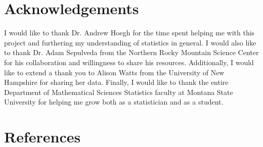 \documentclass[12pt]{article}\usepackage[]{graphicx}\usepackage[]{color}
\begin{document}
\newpage

\section{Acknowledgements}

I would like to thank Dr. Andrew Hoegh for the time spent helping me with this project and furthering my understanding of statistics in general. I would also like to thank Dr. Adam Sepulveda from the Northern Rocky Mountain Science Center for his collaboration and willingness to share his resources. Additionally, I would like to extend a thank you to Alison Watts from the University of New Hampshire for sharing her data. Finally, I would like to thank the entire Department of Mathematical Sciences Statistics faculty at Montana State University for helping me grow both as a statistician and as a student. 

\nocite{*}

\newpage
\section{References}

\begingroup
\renewcommand{\section}[2]{}%
\begin{flushleft}

%
%
%
%

\end{flushleft}
\endgroup

\newpage
\section{Appendix - R Code}

\singlespacing
\end{document}
